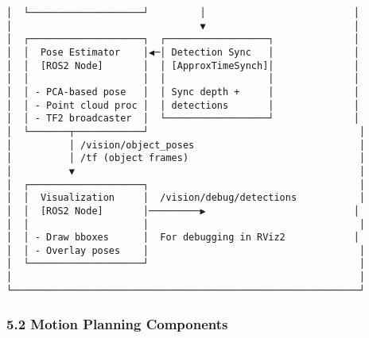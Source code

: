 \documentclass[
]{article}
\begin{document}
\begin{verbatim}
│  └────────────────────┘         │                          │
│                                 ▼                          │
│  ┌────────────────────┐  ┌──────────────────┐              │
│  │  Pose Estimator    │◀─│ Detection Sync   │              │
│  │  [ROS2 Node]       │  │ [ApproxTimeSynch]│              │
│  │                    │  │                  │              │
│  │ - PCA-based pose   │  │ Sync depth +     │              │
│  │ - Point cloud proc │  │ detections       │              │
│  │ - TF2 broadcaster  │  └──────────────────┘              │
│  └───────┬────────────┘                                     │
│          │ /vision/object_poses                             │
│          │ /tf (object frames)                              │
│          ▼                                                  │
│  ┌────────────────────┐                                     │
│  │  Visualization     │  /vision/debug/detections           │
│  │  [ROS2 Node]       │─────────▶                          │
│  │                    │                                     │
│  │ - Draw bboxes      │  For debugging in RViz2            │
│  │ - Overlay poses    │                                     │
│  └────────────────────┘                                     │
│                                                             │
└─────────────────────────────────────────────────────────────┘
\end{verbatim}

\hypertarget{motion-planning-components}{%
\subsubsection{5.2 Motion Planning
Components}\label{motion-planning-components}}
\end{document}
